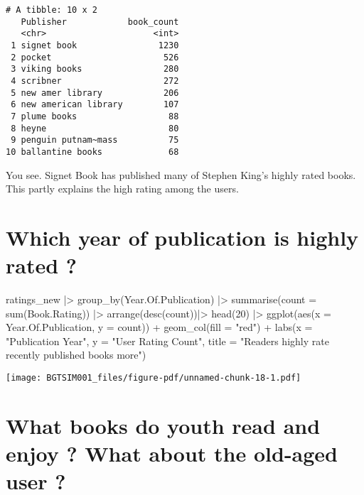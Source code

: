 \documentclass[
]{report}
\newenvironment{Shaded}{\begin{snugshade}}{\end{snugshade}}
\newcommand{\AttributeTok}[1]{\textcolor[rgb]{0.40,0.45,0.13}{#1}}
\newcommand{\DecValTok}[1]{\textcolor[rgb]{0.68,0.00,0.00}{#1}}
\newcommand{\FunctionTok}[1]{\textcolor[rgb]{0.28,0.35,0.67}{#1}}
\newcommand{\NormalTok}[1]{\textcolor[rgb]{0.00,0.23,0.31}{#1}}
\newcommand{\SpecialCharTok}[1]{\textcolor[rgb]{0.37,0.37,0.37}{#1}}
\newcommand{\StringTok}[1]{\textcolor[rgb]{0.13,0.47,0.30}{#1}}
\begin{document}
\begin{verbatim}
# A tibble: 10 x 2
   Publisher            book_count
   <chr>                     <int>
 1 signet book                1230
 2 pocket                      526
 3 viking books                280
 4 scribner                    272
 5 new amer library            206
 6 new american library        107
 7 plume books                  88
 8 heyne                        80
 9 penguin putnam~mass          75
10 ballantine books             68
\end{verbatim}

You see. Signet Book has published many of Stephen King's highly rated
books. This partly explains the high rating among the users.

\section{Which year of publication is highly rated
?}\label{which-year-of-publication-is-highly-rated}

\begin{Shaded}
\begin{Highlighting}[]
\NormalTok{ratings\_new }\SpecialCharTok{|\textgreater{}} \FunctionTok{group\_by}\NormalTok{(Year.Of.Publication) }\SpecialCharTok{|\textgreater{}}
               \FunctionTok{summarise}\NormalTok{(}\AttributeTok{count =} \FunctionTok{sum}\NormalTok{(Book.Rating)) }\SpecialCharTok{|\textgreater{}}
               \FunctionTok{arrange}\NormalTok{(}\FunctionTok{desc}\NormalTok{(count))}\SpecialCharTok{|\textgreater{}} \FunctionTok{head}\NormalTok{(}\DecValTok{20}\NormalTok{) }\SpecialCharTok{|\textgreater{}}
               \FunctionTok{ggplot}\NormalTok{(}\FunctionTok{aes}\NormalTok{(}\AttributeTok{x =}\NormalTok{ Year.Of.Publication, }\AttributeTok{y =}\NormalTok{ count)) }\SpecialCharTok{+} 
               \FunctionTok{geom\_col}\NormalTok{(}\AttributeTok{fill =} \StringTok{"red"}\NormalTok{) }\SpecialCharTok{+} 
               \FunctionTok{labs}\NormalTok{(}\AttributeTok{x =} \StringTok{"Publication Year"}\NormalTok{, }
                    \AttributeTok{y =} \StringTok{"User Rating Count"}\NormalTok{, }
                    \AttributeTok{title =} \StringTok{"Readers highly rate recently published books more"}\NormalTok{)}
\end{Highlighting}
\end{Shaded}

\texttt{[image: BGTSIM001\_files/figure-pdf/unnamed-chunk-18-1.pdf]}

\section{What books do youth read and enjoy ? What about the old-aged
user
?}\label{what-books-do-youth-read-and-enjoy-what-about-the-old-aged-user}
\end{document}
